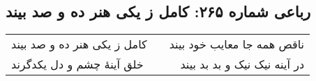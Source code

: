 \begin{center}
\section*{رباعی شماره ۲۶۵: کامل ز یکی هنر ده و صد بیند}
\label{sec:sh265}
\begin{longtable}{l p{0.5cm} r}
کامل ز یکی هنر ده و صد بیند
&&
ناقص همه جا معایب خود بیند
\\
خلق آینهٔ چشم و دل یکدگرند
&&
در آینه نیک نیک و بد بد بیند
\\
\end{longtable}
\end{center}
